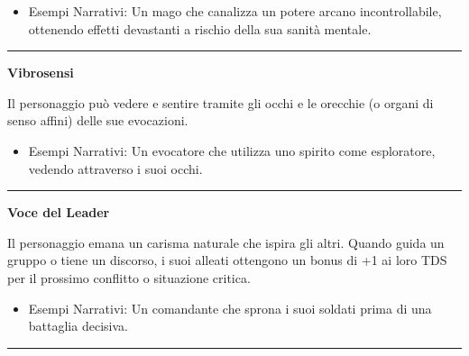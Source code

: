 \documentclass[../manuale_main.tex]{subfiles}
\begin{document}
\begin{itemize}
\item Esempi Narrativi: Un mago che canalizza un potere arcano incontrollabile, ottenendo effetti devastanti a rischio della sua sanità mentale.
\end{itemize}

\vspace{0.5cm}\rule{\textwidth}{0.4pt}\vspace{1cm}

\begin{center}
\textbf{\large{Vibrosensi}}\\
\end{center}
Il personaggio può vedere e sentire tramite gli occhi e le orecchie (o organi di senso affini) delle sue evocazioni.

\begin{itemize}
\item Esempi Narrativi: Un evocatore che utilizza uno spirito come esploratore, vedendo attraverso i suoi occhi.
\end{itemize}

\vspace{0.5cm}\rule{\textwidth}{0.4pt}\vspace{1cm}

\begin{center}
\textbf{\large{Voce del Leader}}\\
\end{center}
Il personaggio emana un carisma naturale che ispira gli altri. Quando guida un gruppo o tiene un discorso, i suoi alleati ottengono un bonus di +1 ai loro TDS per il prossimo conflitto o situazione critica.

\begin{itemize}
\item Esempi Narrativi: Un comandante che sprona i suoi soldati prima di una battaglia decisiva.
\end{itemize}

\vspace{0.5cm}\rule{\textwidth}{0.4pt}\vspace{1cm}
\end{document}
